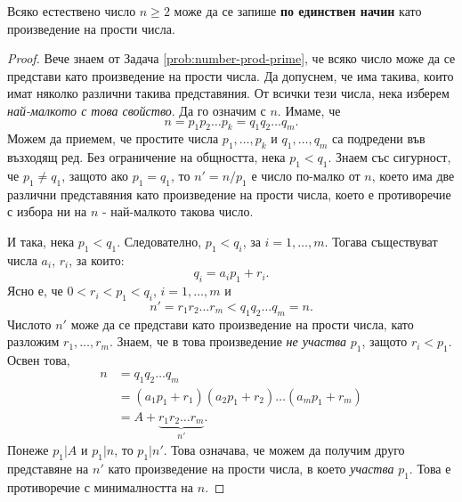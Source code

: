 \begin{thm}
  \label{th:main-arithmetic}
  Всяко естествено число $n \geq 2$ може да се запише {\bf по единствен начин} като произведение на прости числа.
\end{thm}
\begin{proof}
  Вече знаем от Задача \ref{prob:number-prod-prime}, че всяко число може да се представи като произведение на прости числа.
  Да допуснем, че има такива, които имат няколко различни такива представяния.
  От всички тези числа, нека изберем {\em най-малкото с това свойство}.
  Да го означим с $n$. Имаме, че  
  \[n = p_1p_2\dots p_k = q_1q_2\dots q_m.\]
  Можем да приемем, че простите числа $p_1,\dots,p_k$ и $q_1,\dots,q_m$ са подредени във възходящ ред.
  Без ограничение на общността, нека $p_1 < q_1$.
  Знаем със сигурност, че $p_1 \neq q_1$, защото ако $p_1 = q_1$, то $n' = n/p_1$ 
  е число по-малко от $n$, което има две различни представяния като произведение на прости числа, което е противоречие с избора ни на $n$ - 
  най-малкото такова число.
  
  И така, нека $p_1 < q_1$. Следователно, $p_1 < q_i$, за $i = 1, \dots, m$.
  Тогава съществуват числа $a_i$, $r_i$, за които:
  \[q_i = a_ip_1 + r_i.\]
  Ясно е, че $0 < r_i < p_1 < q_i$, $i = 1,\dots, m$ и 
  \[n' = r_1r_2\dots r_m < q_1q_2\dots q_m = n.\]
  Числото $n'$ може да се представи като произведение на прости числа, като разложим $r_1,\dots,r_m$.
  Знаем, че в това произведение {\em не участва} $p_1$, защото $r_i < p_1$.
  Освен това,
  \begin{align*}
    n & = q_1q_2\dots q_m\\
    & = (a_1p_1+r_1)(a_2p_1 + r_2)\dots(a_mp_1+r_m) \\
    & = A + \underbrace{r_1r_2\dots r_m}_{n'}.
  \end{align*}
  Понеже $p_1 | A$ и $p_1 | n$, то $p_1 | n'$.
  Това означава, че можем да получим друго представяне на $n'$ като произведение на прости числа, в което {\em участва} $p_1$.
  Това е противоречие с минималността на $n$.
\end{proof}

